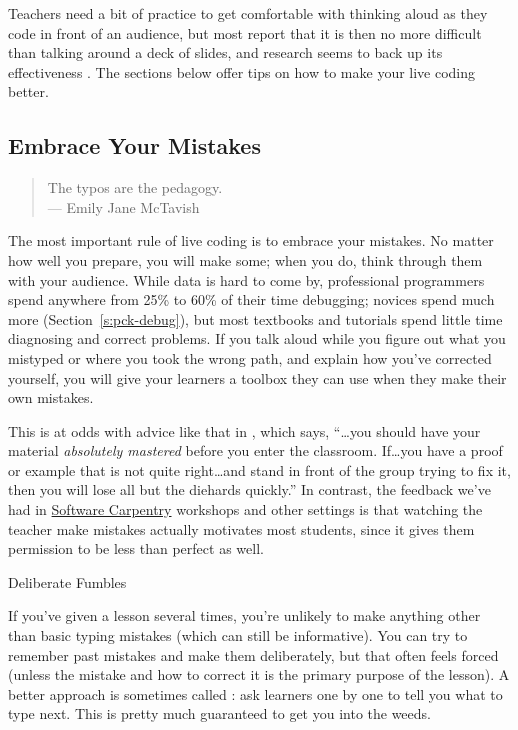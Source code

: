 Teachers need a bit of practice to get comfortable with thinking aloud
as they code in front of an audience, but most report that it is then no
more difficult than talking around a deck of slides, and research seems
to back up its effectiveness \cite{Rubi2013,Haar2017}. The sections
below offer tips on how to make your live coding better.

\subsection*{Embrace Your Mistakes}

\begin{quote}

  The typos are the pedagogy. \\
  --- Emily Jane McTavish

\end{quote}

The most important rule of live coding is to embrace your mistakes. No
matter how well you prepare, you will make some; when you do, think
through them with your audience. While data is hard to come by,
professional programmers spend anywhere from 25\% to 60\% of their time
debugging; novices spend much more (Section~\ref{s:pck-debug}), but most
textbooks and tutorials spend little time diagnosing and correct
problems. If you talk aloud while you figure out what you mistyped or
where you took the wrong path, and explain how you've corrected
yourself, you will give your learners a toolbox they can use when they
make their own mistakes.

This is at odds with advice like that in \cite{Kran2015}, which
says, ``{\ldots}you should have your material \emph{absolutely mastered} before
you enter the classroom. If{\ldots}you have a proof or example that is not
quite right{\ldots}and stand in front of the group trying to fix it, then
you will lose all but the diehards quickly.'' In contrast, the feedback
we've had in \href{http://software-carpentry.org}{Software Carpentry} workshops and other settings is
that watching the teacher make mistakes actually motivates most
students, since it gives them permission to be less than perfect as
well.

\begin{aside}{Deliberate Fumbles}

If you've given a lesson several times, you're unlikely to make
anything other than basic typing mistakes (which can still be
informative). You can try to remember past mistakes and make them
deliberately, but that often feels forced (unless the mistake and
how to correct it is the primary purpose of the lesson). A better
approach is sometimes called : ask
learners one by one to tell you what to type next. This is pretty
much guaranteed to get you into the weeds.

\end{aside}


